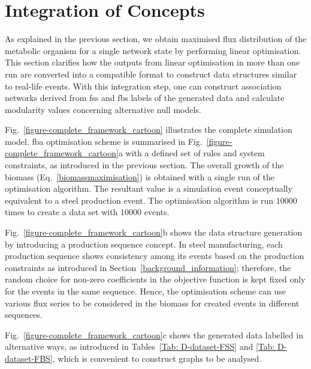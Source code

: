 \section{Integration of Concepts}
As explained in the previous section, we obtain maximised flux distribution of the metabolic organism for a single network state by performing linear optimisation. This section clarifies how the outputs from linear optimisation in more than one run are converted into a compatible format to construct data structures similar to real-life events. With this integration step, one can construct association networks derived from \acs{fss} and \acs{fbs} labels of the generated data and calculate modularity values concerning alternative null models.



Fig.~\ref{figure-complete_framework_cartoon} illustrates the complete simulation model. \acs{fba} optimisation scheme is summarised in Fig.~\ref{figure-complete_framework_cartoon}a with a defined set of rules and system constraints, as introduced in the previous section. The overall growth of the biomass (Eq.~\eqref{biomassmaximisation}) is obtained with a single run of the optimisation algorithm. The resultant value is a simulation event conceptually equivalent to a steel production event. The optimisation algorithm is run $10000$ times to create a data set with $10000$ events. 

Fig.~\ref{figure-complete_framework_cartoon}b shows the data structure generation by introducing a production sequence concept. In steel manufacturing, each production sequence shows consistency among its events based on the production constraints as introduced in Section~\ref{background_information}; therefore, the random choice for non-zero coefficients in the objective function is kept fixed only for the events in the same sequence. Hence, the optimisation scheme can use various flux series to be considered in the biomass for created events in different sequences. 

Fig.~\ref{figure-complete_framework_cartoon}c shows the generated data labelled in alternative ways, as introduced in Tables~\ref{Tab: D-dataset-FSS} and \ref{Tab: D-dataset-FBS}, which is convenient to construct graphs to be analysed.